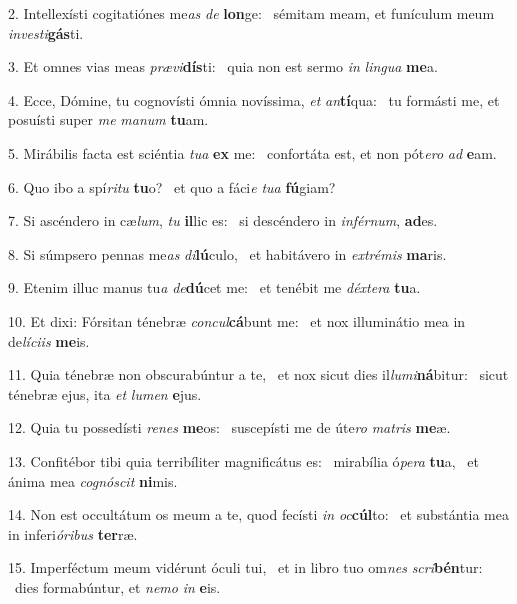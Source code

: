 2. Intellexísti cogitatiónes me\textit{as} \textit{de} \textbf{lon}ge: \ast\  sémitam meam, et funículum meum \textit{in}\textit{ves}\textit{ti}\textbf{gás}ti.\

3. Et omnes vias meas \textit{præ}\textit{vi}\textbf{dís}ti: \ast\  quia non est sermo \textit{in} \textit{lin}\textit{gua} \textbf{me}a.\

4. Ecce, Dómine, tu cognovísti ómnia novíssima, \textit{et} \textit{an}\textbf{tí}qua: \ast\  tu formásti me, et posuísti super \textit{me} \textit{ma}\textit{num} \textbf{tu}am.\

5. Mirábilis facta est sciéntia \textit{tu}\textit{a} \textbf{ex} me: \ast\  confortáta est, et non pót\textit{e}\textit{ro} \textit{ad} \textbf{e}am.\

6. Quo ibo a spí\textit{ri}\textit{tu} \textbf{tu}o? \ast\  et quo a fáci\textit{e} \textit{tu}\textit{a} \textbf{fú}giam?\

7. Si ascéndero in cæ\textit{lum}, \textit{tu} \textbf{il}lic es: \ast\  si descéndero in \textit{in}\textit{fér}\textit{num}, \textbf{ad}es.\

8. Si súmpsero pennas me\textit{as} \textit{di}\textbf{lú}culo, \ast\  et habitávero in \textit{ex}\textit{tré}\textit{mis} \textbf{ma}ris.\

9. Etenim illuc manus tu\textit{a} \textit{de}\textbf{dú}cet me: \ast\  et tenébit me \textit{déx}\textit{te}\textit{ra} \textbf{tu}a.\

10. Et dixi: Fórsitan ténebræ \textit{con}\textit{cul}\textbf{cá}bunt me: \ast\  et nox illuminátio mea in de\textit{lí}\textit{ci}\textit{is} \textbf{me}is.\

11. Quia ténebræ non obscurabúntur a te, \dag\  et nox sicut dies il\textit{lu}\textit{mi}\textbf{ná}bitur: \ast\  sicut ténebræ ejus, ita \textit{et} \textit{lu}\textit{men} \textbf{e}jus.\

12. Quia tu possedísti \textit{re}\textit{nes} \textbf{me}os: \ast\  suscepísti me de úte\textit{ro} \textit{ma}\textit{tris} \textbf{me}æ.\

13. Confitébor tibi quia terribíliter magnificátus es: \dag\  mirabília ó\textit{pe}\textit{ra} \textbf{tu}a, \ast\  et ánima mea \textit{co}\textit{gnó}\textit{scit} \textbf{ni}mis.\

14. Non est occultátum os meum a te, quod fecísti \textit{in} \textit{oc}\textbf{cúl}to: \ast\  et substántia mea in inferi\textit{ó}\textit{ri}\textit{bus} \textbf{ter}ræ.\

15. Imperféctum meum vidérunt óculi tui, \dag\  et in libro tuo om\textit{nes} \textit{scri}\textbf{bén}tur: \ast\  dies formabúntur, et \textit{ne}\textit{mo} \textit{in} \textbf{e}is.\

